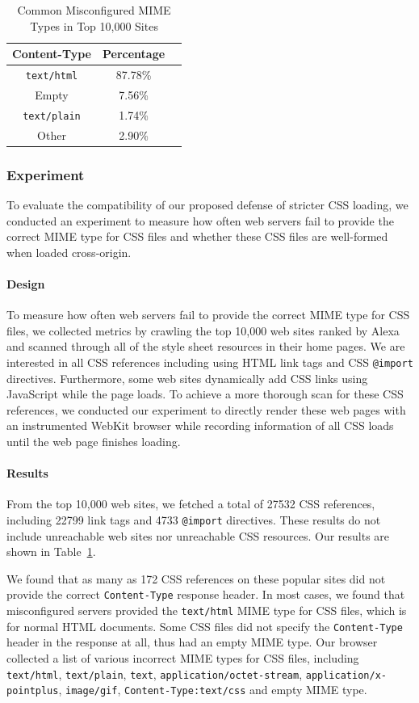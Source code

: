 \documentclass{acm_proc_article-sp}
\begin{document}
\begin{table}
\centering
\begin{tabular}{|c|c|c|} \hline
Content-Type&Percentage\\ \hline
\texttt{text/html}&87.78\%\\ \hline
Empty&7.56\%\\ \hline
\texttt{text/plain}&1.74\%\\ \hline
Other&2.90\%\\
\hline\end{tabular}
\caption{Common Misconfigured MIME Types in Top 10,000 Sites}
\label{table:MIME}
\end{table}

\subsubsection{Experiment}
To evaluate the compatibility of our proposed defense of stricter CSS loading, we conducted an experiment to measure how often web servers fail to provide the correct MIME type for CSS files and whether these CSS files are well-formed when loaded cross-origin.

\paragraph{Design}
To measure how often web servers fail to provide the correct MIME type for CSS files, we collected metrics by crawling the top 10,000 web sites ranked by Alexa\cite{alexa} and scanned through all of the style sheet resources in their home pages. We are interested in all CSS references including using HTML link tags and CSS \texttt{@import} directives. Furthermore, some web sites dynamically add CSS links using JavaScript while the page loads. To achieve a more thorough scan for these CSS references, we conducted our experiment to directly render these web pages with an instrumented WebKit browser while recording information of all CSS loads until the web page finishes loading.

\paragraph{Results}
From the top 10,000 web sites, we fetched a total of 27532 CSS references, including 22799 link tags and 4733 \texttt{@import} directives. These results do not include unreachable web sites nor unreachable CSS resources.
Our results are shown in Table~\ref{table:MIME}.

We found that as many as 172 CSS references on these popular sites did not provide the correct \texttt{Content-Type} response header. In most cases, we found that misconfigured servers provided the \texttt{text/html} MIME type for CSS files, which is for normal HTML documents. Some CSS files did not specify the \texttt{Content-Type} header in the response at all, thus had an empty MIME type. Our browser collected a list of various incorrect MIME types for CSS files, including \texttt{text/html}, \texttt{text/plain}, \texttt{text}, \texttt{application/octet-stream}, \texttt{application/x-pointplus}, \texttt{image/gif}, \texttt{Content-Type:text/css} and empty MIME type.
\end{document}
